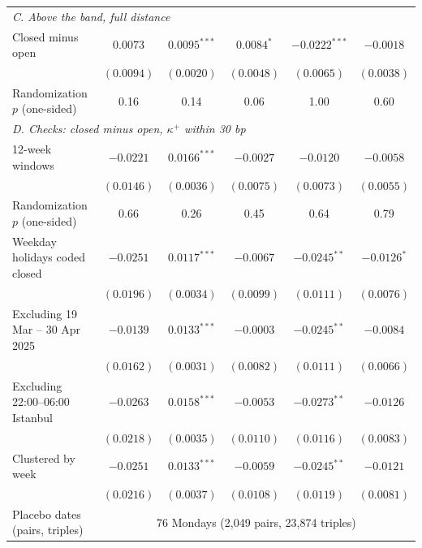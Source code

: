 \begin{tabular}{lccccc}
\multicolumn{6}{l}{\emph{C. Above the band, full distance}} \\
Closed minus open & $0.0073$ & $0.0095^{***}$ & $0.0084^{*}$ & $-0.0222^{***}$ & $-0.0018$ \\
 & $(0.0094)$ & $(0.0020)$ & $(0.0048)$ & $(0.0065)$ & $(0.0038)$ \\
\quad Randomization $p$ (one-sided) & 0.16 & 0.14 & 0.06 & 1.00 & 0.60 \\
\multicolumn{6}{l}{\emph{D. Checks: closed minus open, $\kappa^+$ within 30 bp}} \\
12-week windows & $-0.0221$ & $0.0166^{***}$ & $-0.0027$ & $-0.0120$ & $-0.0058$ \\
 & $(0.0146)$ & $(0.0036)$ & $(0.0075)$ & $(0.0073)$ & $(0.0055)$ \\
\quad Randomization $p$ (one-sided) & 0.66 & 0.26 & 0.45 & 0.64 & 0.79 \\
Weekday holidays coded closed & $-0.0251$ & $0.0117^{***}$ & $-0.0067$ & $-0.0245^{**}$ & $-0.0126^{*}$ \\
 & $(0.0196)$ & $(0.0034)$ & $(0.0099)$ & $(0.0111)$ & $(0.0076)$ \\
Excluding 19 Mar -- 30 Apr 2025 & $-0.0139$ & $0.0133^{***}$ & $-0.0003$ & $-0.0245^{**}$ & $-0.0084$ \\
 & $(0.0162)$ & $(0.0031)$ & $(0.0082)$ & $(0.0111)$ & $(0.0066)$ \\
Excluding 22:00--06:00 Istanbul & $-0.0263$ & $0.0158^{***}$ & $-0.0053$ & $-0.0273^{**}$ & $-0.0126$ \\
 & $(0.0218)$ & $(0.0035)$ & $(0.0110)$ & $(0.0116)$ & $(0.0083)$ \\
Clustered by week & $-0.0251$ & $0.0133^{***}$ & $-0.0059$ & $-0.0245^{**}$ & $-0.0121$ \\
 & $(0.0216)$ & $(0.0037)$ & $(0.0108)$ & $(0.0119)$ & $(0.0081)$ \\
\midrule
Placebo dates (pairs, triples) & \multicolumn{5}{c}{76 Mondays (2,049 pairs, 23,874 triples)} \\
\bottomrule
\end{tabular}
